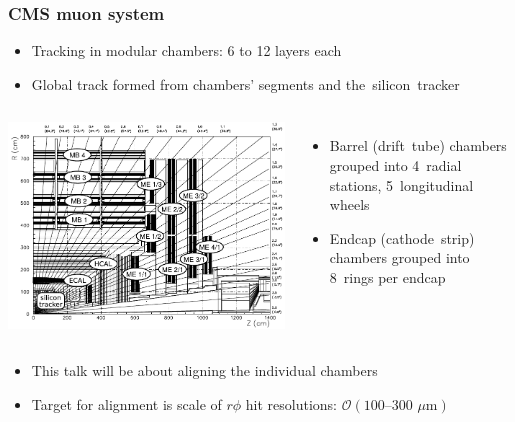 \documentclass[compress]{beamer}
\begin{document}
\begin{frame}
\frametitle{CMS muon system}

\begin{itemize}
\item Tracking in modular chambers: 6 to 12 layers each
\item Global track formed from chambers' segments and \mbox{the silicon tracker\hspace{-1 cm}}
\end{itemize}

\begin{columns}
\includegraphics[width=\linewidth]{muon_system_labeled.pdf}

\begin{itemize}
\item Barrel \mbox{(drift tube)} chambers grouped into 4~radial stations, 5~longitudinal wheels
\item Endcap \mbox{(cathode strip)} chambers grouped into 8~rings per endcap
\end{itemize}
\end{columns}

\begin{itemize}
\item This talk will be about aligning the individual chambers
\item Target for alignment is scale of $r\phi$ hit resolutions: $\mathcal{O}(\mbox{100--300~$\mu$m})$
\end{itemize}
\end{frame}
\end{document}

